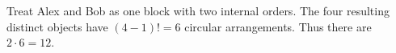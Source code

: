 Treat Alex and Bob as one block with two internal orders. The four resulting distinct objects have $(4-1)!=6$ circular arrangements. Thus there are $2\cdot6=\boxed{12}$.
